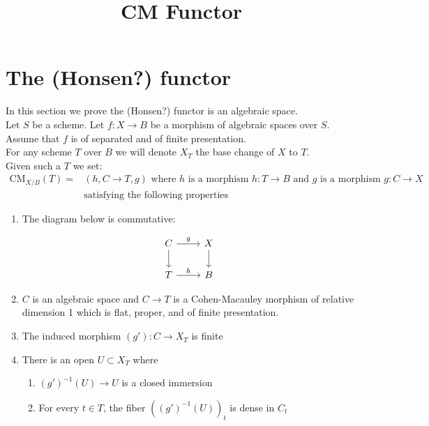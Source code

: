 \documentclass{article}
\title{
    \textmd{\textbf{CM Functor}}\\
}
\author{}
\date{}
\theoremstyle{definition}
\theoremstyle{theorem}
\theoremstyle{remark}
\theoremstyle{definition}
\newcommand{\CMfunctor}{\text{CM}}
\begin{document}
\maketitle

\section{The (Honsen?) functor}
\label{section-cm}

\noindent
In this section we prove the (Honsen?) functor is an algebraic space.\\

Let $S$ be a scheme. Let $f : X \to B$ be a morphism of
algebraic spaces over $S$. Assume that $f$ is of separated and of finite presentation.\\

For any scheme $T$ over $B$ we will denote $X_T$ the base change of $X$ to $T$.\\

Given such a $T$ we set:
\begin{align*}
\CMfunctor_{X/B}(T) = & (h, C \to T, g)  \text{ where } 
h \text{ is a morphism } h : T \to B \text{ and } g \text{ is a morphism } g : C \to X \\ & \text{satisfying the following properties}
\end{align*}
\begin{enumerate}
\item The diagram below is commutative: 

\[ \begin{tikzcd}
C \arrow{r}{g} \arrow{d} & X \arrow{d} \\%
T \arrow{r}{h}& B
\end{tikzcd}
\]

\item $C$ is an algebraic space and $C \to T$ is a Cohen-Macauley morphism of relative dimension 1 which is flat, proper, and of finite presentation.
\item The induced morphism $(g') : C \to X_T$ is finite
\item There is an open $U \subset X_T$ where
\begin{enumerate}
\item $(g')^{-1}(U) \to U$ is a closed immersion
\item For every $t \in T$, the fiber $\left((g')^{-1}(U)\right)_t$ is dense in $C_t$
\end{enumerate}
\end{enumerate}
\end{document}
